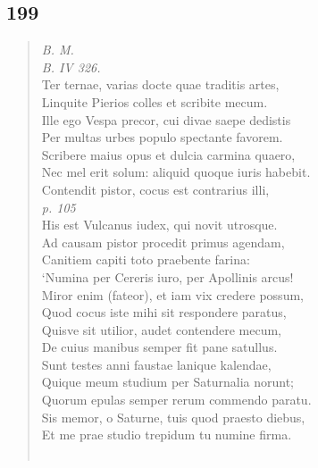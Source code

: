 \documentclass[11pt, a4paper]{report}
\begin{document}
            \subsection*{199}
      \begin{verse}
      \textit{B. M.} \\ \textit{B. IV 326.} \\ Ter ternae, varias docte quae traditis artes, \\ Linquite Pierios colles et scribite mecum. \\ Ille ego Vespa precor, cui divae saepe dedistis \\ Per multas urbes populo spectante favorem. \\ Scribere maius opus et dulcia carmina quaero, \\ Nec mel erit solum: aliquid quoque iuris habebit. \\ Contendit pistor, cocus est contrarius illi, \\ \textit{p. 105} \\ His est Vulcanus iudex, qui novit utrosque. \\ Ad causam pistor procedit primus agendam, \\ Canitiem capiti toto praebente farina: \\ ‘Numina per Cereris iuro, per Apollinis arcus! \\ Miror enim (fateor), et iam vix credere possum, \\ Quod cocus iste mihi sit respondere paratus, \\ Quisve sit utilior, audet contendere mecum, \\ De cuius manibus semper fit pane satullus. \\ Sunt testes anni faustae lanique kalendae, \\ Quique meum studium per Saturnalia norunt; \\ Quorum epulas semper rerum commendo paratu. \\ Sis memor, o Saturne, tuis quod praesto diebus, \\ Et me prae studio trepidum tu numine firma. \\ 
        ﻿\pagebreak 

\end{verse}
\end{document}
